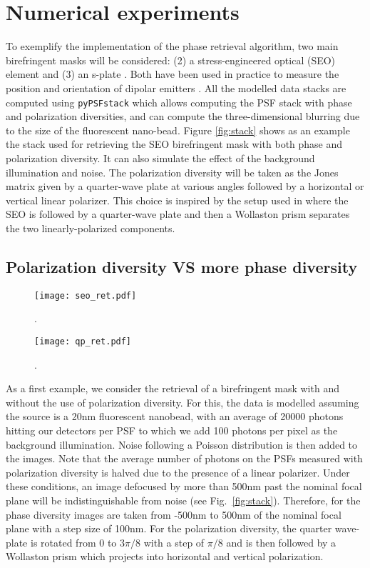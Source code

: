 \documentclass[reprint,aps,pra,superscriptaddress,
amsmath,amssymb]{revtex4-1}
\begin{document}
\section{Numerical experiments}

To exemplify the implementation of the phase retrieval algorithm, 
two main birefringent masks will be considered: (2) a stress-engineered optical 
(SEO) element \cite{} and (3) an s-plate \cite{marrucci2006optical}. 
Both have been used in practice to measure
the position and orientation of dipolar emitters \cite{}. All the modelled
data stacks are computed using \texttt{pyPSFstack} which allows
computing the PSF stack with phase and polarization diversities, and can 
compute the three-dimensional blurring due to the size of the fluorescent
nano-bead. Figure \ref{fig:stack} shows as an example the stack used for 
retrieving the SEO birefringent mask with both phase and polarization diversity. 
It can also simulate the effect of the background illumination
and noise. The polarization diversity will be taken as the Jones matrix
given by a quarter-wave plate at various angles followed by a horizontal or 
vertical linear polarizer. This choice is inspired by the setup used in \cite{}
where the SEO is followed by a quarter-wave plate and then a Wollaston
prism separates the two linearly-polarized components. 

\subsection{Polarization diversity VS more phase diversity}

\begin{figure}
  \centering
  \texttt{[image: seo\_ret.pdf]}
  \caption{\label{fig:seo_ret} . }
\end{figure}

\begin{figure}
  \centering
  \texttt{[image: qp\_ret.pdf]}
  \caption{\label{fig:qp_ret} . }
\end{figure}

As a first example, we consider the retrieval of a birefringent mask with and without
the use of polarization diversity. For this, the data is modelled assuming 
the source is a 20nm fluorescent nanobead,
with an average of 20000 photons hitting our detectors 
per PSF to which we add 100 photons per pixel 
as the background illumination. Noise following a Poisson distribution
is then added to the images. Note that the average number of photons on the 
PSFs measured with polarization diversity is halved due to the presence of a linear 
polarizer. Under these conditions, an image defocused by more 
than 500nm past the nominal focal plane will be indistinguishable from noise 
(see Fig.~\ref{fig:stack}). 
Therefore, for the phase diversity images are taken from -500nm to 500nm of the 
nominal focal plane with a step size of 100nm. For the polarization diversity, the 
quarter wave-plate is rotated from $0$ to $3\pi/8$ with a step of $\pi/8$ and is
then followed by a Wollaston prism which projects into horizontal and vertical 
polarization.
\end{document}
